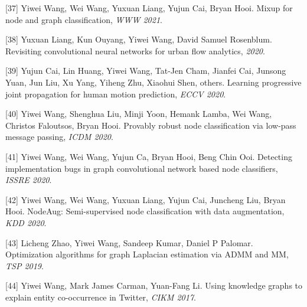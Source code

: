[37] Yiwei Wang, Wei Wang, Yuxuan Liang, Yujun Cai, Bryan Hooi. Mixup for node and graph classification, \textit{WWW 2021}.

[38] Yuxuan Liang, Kun Ouyang, Yiwei Wang, David Samuel Rosenblum. Revisiting convolutional neural networks for urban flow analytics, \textit{ 2020}.

[39] Yujun Cai, Lin Huang, Yiwei Wang, Tat-Jen Cham, Jianfei Cai, Junsong Yuan, Jun Liu, Xu Yang, Yiheng Zhu, Xiaohui Shen, others. Learning progressive joint propagation for human motion prediction, \textit{ECCV 2020}.

[40] Yiwei Wang, Shenghua Liu, Minji Yoon, Hemank Lamba, Wei Wang, Christos Faloutsos, Bryan Hooi. Provably robust node classification via low-pass message passing, \textit{ICDM 2020}.

[41] Yiwei Wang, Wei Wang, Yujun Ca, Bryan Hooi, Beng Chin Ooi. Detecting implementation bugs in graph convolutional network based node classifiers, \textit{ISSRE 2020}.

[42] Yiwei Wang, Wei Wang, Yuxuan Liang, Yujun Cai, Juncheng Liu, Bryan Hooi. NodeAug: Semi-supervised node classification with data augmentation, \textit{KDD 2020}.

[43] Licheng Zhao, Yiwei Wang, Sandeep Kumar, Daniel P Palomar. Optimization algorithms for graph Laplacian estimation via ADMM and MM, \textit{TSP 2019}.

[44] Yiwei Wang, Mark James Carman, Yuan-Fang Li. Using knowledge graphs to explain entity co-occurrence in Twitter, \textit{CIKM 2017}.